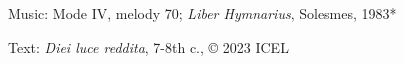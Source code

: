 \hymn



\medskip\begin{hymnsource}
Music: Mode IV, melody 70; \emph{Liber Hymnarius}, Solesmes, 1983*

Text: \emph{Diei luce reddita}, 7-8th c., © 2023 ICEL
\end{hymnsource}
